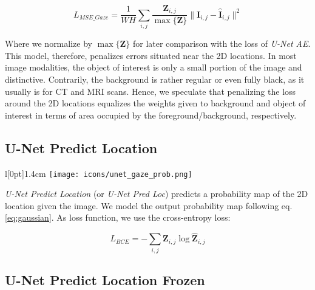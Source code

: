 \begin{equation}
L_{MSE\_Gaze} = \frac{1}{W H} \sum_{i,j} \frac{\boldsymbol{Z}_{i,j}}{\max{\{\boldsymbol{Z}\}}} \|\boldsymbol{I}_{i,j} - \boldsymbol{\hat{I}}_{i,j}\|^2
\label{eq:mse_gaze_loss}
\end{equation}
\hspace{6pt}

Where we normalize by $\max{\{\boldsymbol{Z}\}}$ for later comparison with the loss of \textit{U-Net AE}.
This model, therefore, penalizes errors situated near the 2D locations.
In most image modalities, the object of interest is only a small portion of the image and distinctive.
Contrarily, the background is rather regular or even fully black, as it usually is for CT and MRI scans.
Hence, we speculate that penalizing the loss around the 2D locations equalizes the weights given to background and object of interest in terms of area occupied by the foreground/background, respectively.

\subsection{U-Net Predict Location} \label{sec:unet_pred_loc}

\begin{wrapfigure}[4]{l}[0pt]{1.4cm}
\texttt{[image: icons/unet\_gaze\_prob.png]}
\end{wrapfigure}

\textit{U-Net Predict Location} (or \textit{U-Net Pred Loc}) predicts a probability map of the 2D location given the image.
We model the output probability map following eq. \ref{eq:gaussian}.
As loss function, we use the cross-entropy loss:

\begin{equation}
L_{BCE} = -\sum_{i,j} \boldsymbol{Z}_{i,j} \log{\boldsymbol{\hat{Z}}_{i,j}}
\label{eq:ce_loss}
\end{equation}
\hspace{6pt}

\clearpage
\subsection{U-Net Predict Location Frozen}

